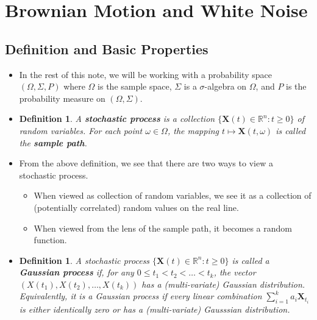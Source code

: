\documentclass[10pt]{article}
\newtheorem{definition}[lemma]{Definition}
\newcommand{\ve}[1]{\mathbf{#1}}
\newcommand{\Real}{\mathbb{R}}
\begin{document}
\section{Brownian Motion and White Noise}

\subsection{Definition and Basic Properties}

\begin{itemize}
  \item In the rest of this note, we will be working with a probability space $(\Omega, \Sigma, P)$ where $\Omega$ is the sample space, $\Sigma$ is a $\sigma$-algebra on $\Omega$, and $P$ is the probability measure on $(\Omega,\Sigma)$.

  \item \begin{definition}
    A {\bf stochastic process} is a collection $\{\ve{X}(t) \in \Real^n : t \geq 0\}$ of random variables. For each point $\omega \in \Omega$, the mapping $t \mapsto \ve{X}(t,\omega)$ is called the {\bf sample path}.
  \end{definition}  

  \item From the above definition, we see that there are two ways to view a stochastic process.
  \begin{itemize}
    \item When viewed as collection of random variables, we see it as a collection of (potentially correlated) random values on the real line.
    \item When viewed from the lens of the sample path, it becomes a random function.
  \end{itemize}

  \item \begin{definition}
    A stochastic process $\{ \ve{X}(t) \in \Real^n: t \geq 0 \}$ is called a {\bf Gaussian process} if, for any $0 \leq t_1 < t_2 < \dotsc < t_k$, the vector $(X(t_1), X(t_2), \dotsc, X(t_k))$ has a (multi-variate) Gaussian distribution. Equivalently, it is a Gaussian process if every linear combination $\sum_{i=1}^k a_i \ve{X}_{t_i}$ is either identically zero or has a (multi-variate) Gausssian distribution.
  \end{definition}


\end{itemize}
\end{document}
